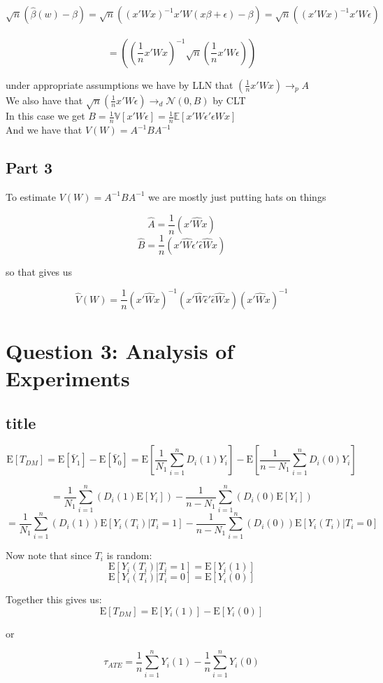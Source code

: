 \documentclass[11pt]{article}
\newcommand{\plim}{\rightarrow_{p}}
\newcommand{\E}{\mathrm{E}}
\begin{document}
$$ \sqrt{n} (\hat{\beta}(w)- \beta) = \sqrt{n}((x'Wx)^{-1}x'W(x\beta+\epsilon)-\beta)  
= \sqrt{n}((x'Wx)^{-1}x'W \epsilon)$$ \\
$$ = ((\frac{1}{n}x'Wx)^{-1} \sqrt{n} (\frac{1}{n} x'W\epsilon))$$

under appropriate assumptions we have by LLN that $ (\frac{1}{n}x'Wx) \plim A $ \\
We also have that $  \sqrt{n} (\frac{1}{n} x'W\epsilon) \rightarrow_{d} \mathcal{N}(0,B)$ by CLT  \\
In this case we get $ B = \frac{1}{n}  \mathbb{V}[x'W\epsilon] = \frac{1}{n} \mathbb{E}[x'W\epsilon'\epsilon Wx] $\\
And we have that $ V(W) = A^{-1}BA^{-1} $
 
\subsection{Part 3}

To estimate $V(W) = A^{-1}BA^{-1} $ we are mostly just putting hats on things 

$$\hat{A} = \frac{1}{n}(x'\hat{W}x)$$ 
$$\hat{B} = \frac{1}{n}(x'\hat{W} \hat{\epsilon}' \hat{\epsilon} \hat{W}x)$$

 so that gives us 
 
 $$ \hat{V}(W) = \frac{1}{n} (x'\hat{W}x)^{-1} (x'\hat{W} \hat{\epsilon}' \hat{\epsilon} \hat{W}x) (x'\hat{W}x)^{-1} $$
 
 \section{Question 3: Analysis of Experiments}
 
 \subsection{title}
 
 $$\E[T_{DM}] = \E[\bar{Y}_1] - \E[\bar{Y}_0] = \E \left[ \frac{1}{N_1} \sum_{i=1}^{n} D_i(1) Y_i  \right]  
 -  \E \left[ \frac{1}{n-N_1} \sum_{i=1}^{n} D_i(0) Y_i  \right]  $$
 
 $$ =  \frac{1}{N_1} \sum_{i=1}^{n} \left(  D_i(1) \E[Y_i] \right) - \frac{1}{n-N_1} \sum_{i=1}^{n} \left(  D_i(0) \E[Y_i] \right) $$
 $$=  \frac{1}{N_1} \sum_{i=1}^{n} \left( D_i(1) \right) \E[Y_i(T_i)|T_i = 1]  - \frac{1}{n-N_1} \sum_{i=1}^{n} \left( D_i(0) \right) \E[Y_i(T_i)|T_i =0] $$
 
 Now note that since $T_i$ is random: 
 $$ \E[Y_i(T_i)|T_i = 1] = \E[Y_i(1)] $$
 $$ \E[Y_i(T_i)|T_i = 0] = \E[Y_i(0)] $$
 
 Together this gives us: 
  $$\E[T_{DM}] = \E[Y_i(1)] - \E[Y_i(0)] $$
  
 or
 
 $$\tau_{ATE} = \frac{1}{n} \sum_{i=1}^{n} Y_i(1) - \frac{1}{n} \sum_{i=1}^{n} Y_i(0) $$
\end{document}
